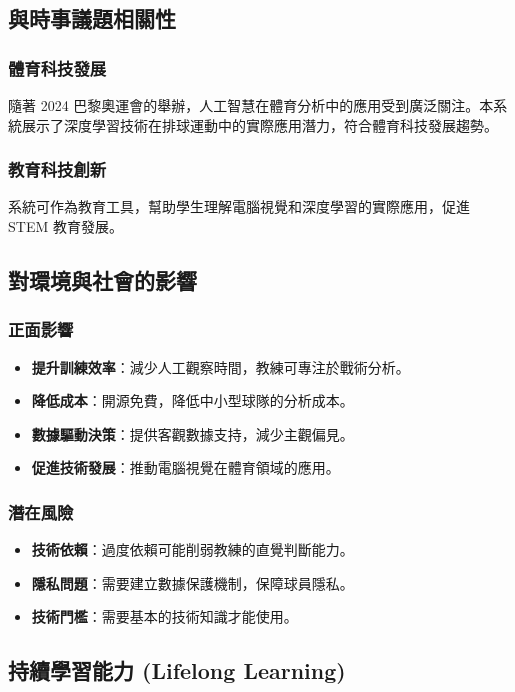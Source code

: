 \documentclass[a4paper,14pt,oneside]{article}
\begin{document}
\subsection{與時事議題相關性}

\subsubsection{體育科技發展}
隨著 2024 巴黎奧運會的舉辦，人工智慧在體育分析中的應用受到廣泛關注。本系統展示了深度學習技術在排球運動中的實際應用潛力，符合體育科技發展趨勢。

\subsubsection{教育科技創新}
系統可作為教育工具，幫助學生理解電腦視覺和深度學習的實際應用，促進 STEM 教育發展。

\subsection{對環境與社會的影響}

\subsubsection{正面影響}
\begin{itemize}
    \item \textbf{提升訓練效率}：減少人工觀察時間，教練可專注於戰術分析。
    \item \textbf{降低成本}：開源免費，降低中小型球隊的分析成本。
    \item \textbf{數據驅動決策}：提供客觀數據支持，減少主觀偏見。
    \item \textbf{促進技術發展}：推動電腦視覺在體育領域的應用。
\end{itemize}

\subsubsection{潛在風險}
\begin{itemize}
    \item \textbf{技術依賴}：過度依賴可能削弱教練的直覺判斷能力。
    \item \textbf{隱私問題}：需要建立數據保護機制，保障球員隱私。
    \item \textbf{技術門檻}：需要基本的技術知識才能使用。
\end{itemize}

\subsection{持續學習能力 (Lifelong Learning)}
\end{document}
